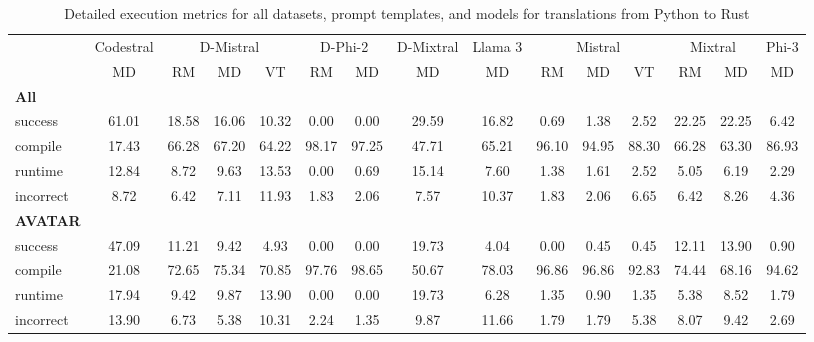 \begin{table}[t]
\caption{Detailed execution metrics for all datasets, prompt templates, and models for translations from Python to Rust}
\label{tab:iteration_1_stats_percent_Python_Rust}

\setlength{\tabcolsep}{2.5pt} %
\renewcommand{\arraystretch}{1} %

\footnotesize
\begin{tabular}{@{}lcccccccccccccc@{}}
\toprule
 & Codestral & \multicolumn{3}{c}{D-Mistral} & \multicolumn{2}{c}{D-Phi-2} & D-Mixtral & Llama 3 & \multicolumn{3}{c}{Mistral}  & \multicolumn{2}{c}{Mixtral} & Phi-3 \\ 

\cmidrule(l){2-2}
\cmidrule(l){3-5}
\cmidrule(l){6-7}
\cmidrule(l){8-8}
\cmidrule(l){9-9}
\cmidrule(l){10-12}
\cmidrule(l){13-14}
\cmidrule(l){15-15}

& \multicolumn{1}{c}{MD}
& \multicolumn{1}{c}{RM}
& \multicolumn{1}{c}{MD}
& \multicolumn{1}{c}{VT}
& \multicolumn{1}{c}{RM}
& \multicolumn{1}{c}{MD} 
& \multicolumn{1}{c}{MD} 
& \multicolumn{1}{c}{MD} 
& \multicolumn{1}{c}{RM} 
& \multicolumn{1}{c}{MD} 
& \multicolumn{1}{c}{VT} 
& \multicolumn{1}{c}{RM}
& \multicolumn{1}{c}{MD} 
& \multicolumn{1}{c}{MD} \\

\midrule
\textbf{All} & & & & & & & & & & & & & & \\ 
\quad success & 61.01 & 18.58 & 16.06 & 10.32 & 0.00 & 0.00 & 29.59 & 16.82 & 0.69 & 1.38 & 2.52 & 22.25 & 22.25 & 6.42 \\
\qquad compile & 17.43 & 66.28 & 67.20 & 64.22 & 98.17 & 97.25 & 47.71 & 65.21 & 96.10 & 94.95 & 88.30 & 66.28 & 63.30 & 86.93 \\
\qquad runtime & 12.84 & 8.72 & 9.63 & 13.53 & 0.00 & 0.69 & 15.14 & 7.60 & 1.38 & 1.61 & 2.52 & 5.05 & 6.19 & 2.29 \\
\qquad incorrect & 8.72 & 6.42 & 7.11 & 11.93 & 1.83 & 2.06 & 7.57 & 10.37 & 1.83 & 2.06 & 6.65 & 6.42 & 8.26 & 4.36 \\
 

\textbf{AVATAR} & & & & & & & & & & & & & & \\
\quad success & 47.09 & 11.21 & 9.42 & 4.93 & 0.00 & 0.00 & 19.73 & 4.04 & 0.00 & 0.45 & 0.45 & 12.11 & 13.90 & 0.90 \\
\qquad compile & 21.08 & 72.65 & 75.34 & 70.85 & 97.76 & 98.65 & 50.67 & 78.03 & 96.86 & 96.86 & 92.83 & 74.44 & 68.16 & 94.62 \\
\qquad runtime & 17.94 & 9.42 & 9.87 & 13.90 & 0.00 & 0.00 & 19.73 & 6.28 & 1.35 & 0.90 & 1.35 & 5.38 & 8.52 & 1.79 \\
\qquad incorrect & 13.90 & 6.73 & 5.38 & 10.31 & 2.24 & 1.35 & 9.87 & 11.66 & 1.79 & 1.79 & 5.38 & 8.07 & 9.42 & 2.69 \\
 


\end{tabular}
\end{table}
